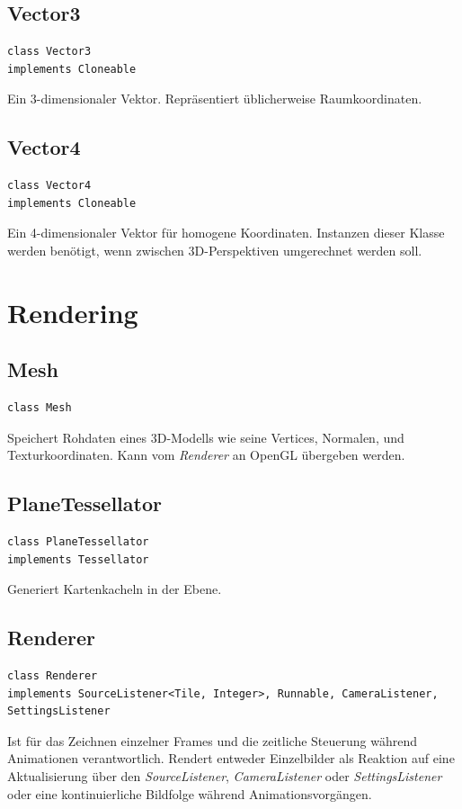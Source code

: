 \documentclass[10pt]{scrreprt}
\begin{document}
\vspace{5mm}
\subsection*{Vector3}
\begin{lstlisting}
class Vector3
implements Cloneable
\end{lstlisting}
Ein 3-dimensionaler Vektor. Repräsentiert üblicherweise Raumkoordinaten.\\

\vspace{5mm}
\subsection*{Vector4}
\begin{lstlisting}
class Vector4
implements Cloneable
\end{lstlisting}
Ein 4-dimensionaler Vektor für homogene Koordinaten. Instanzen dieser Klasse werden benötigt, wenn zwischen 3D-Perspektiven umgerechnet werden soll.\\





\vspace{5mm}
\section{Rendering}
\subsection*{Mesh}
\begin{lstlisting}
class Mesh
\end{lstlisting}
Speichert Rohdaten eines 3D-Modells wie seine Vertices, Normalen, und Texturkoordinaten. Kann vom \textit{Renderer} an OpenGL übergeben werden.\\

\vspace{5mm}
\subsection*{PlaneTessellator}
\begin{lstlisting}
class PlaneTessellator
implements Tessellator
\end{lstlisting}
Generiert Kartenkacheln in der Ebene.\\

\vspace{5mm}
\subsection*{Renderer}
\begin{lstlisting}
class Renderer
implements SourceListener<Tile, Integer>, Runnable, CameraListener, SettingsListener
\end{lstlisting}
Ist für das Zeichnen einzelner Frames und die zeitliche Steuerung während Animationen verantwortlich. Rendert entweder Einzelbilder als Reaktion auf eine Aktualisierung über den \textit{SourceListener}, \textit{CameraListener} oder \textit{SettingsListener} oder eine kontinuierliche Bildfolge während Animationsvorgängen.\\
\end{document}
